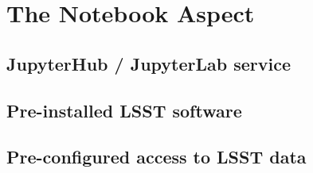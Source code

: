 \section{The Notebook Aspect}\label{notebook-aspect}

\subsection{JupyterHub / JupyterLab service}\label{jupyterhub-jupyterlab-service}

\subsection{Pre-installed LSST software}\label{pre-installed-lsst-software}

\subsection{Pre-configured access to LSST data}\label{pre-configured-access-to-lsst-data}

